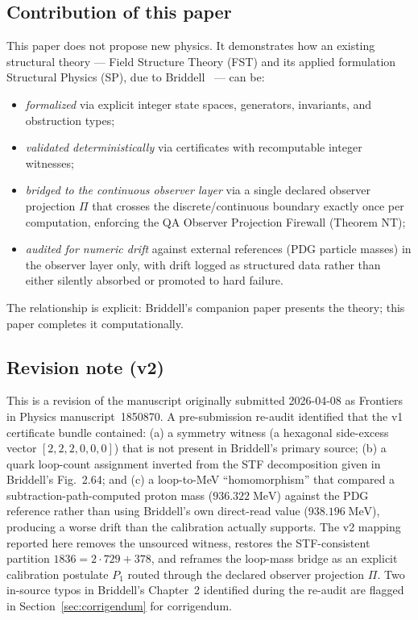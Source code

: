 \documentclass[12pt,a4paper]{article}
\begin{document}
\subsection{Contribution of this paper}

This paper does not propose new physics. It demonstrates how an existing
structural theory --- Field Structure Theory (FST) and its applied
formulation Structural Physics (SP), due to Briddell~\cite{briddellbook2020,
briddell2026} --- can be:
\begin{itemize}[nosep]
  \item \emph{formalized} via explicit integer state spaces, generators,
        invariants, and obstruction types;
  \item \emph{validated deterministically} via certificates with
        recomputable integer witnesses;
  \item \emph{bridged to the continuous observer layer} via a single
        declared observer projection $\Pi$ that crosses the discrete/continuous
        boundary exactly once per computation, enforcing the QA Observer
        Projection Firewall (Theorem NT);
  \item \emph{audited for numeric drift} against external references (PDG
        particle masses) in the observer layer only, with drift logged as
        structured data rather than either silently absorbed or promoted to
        hard failure.
\end{itemize}
The relationship is explicit: Briddell's companion paper presents the
theory; this paper completes it computationally.

\subsection{Revision note (v2)}

This is a revision of the manuscript originally submitted 2026-04-08
as Frontiers in Physics manuscript~1850870. A pre-submission re-audit
identified that the v1 certificate bundle contained: (a) a symmetry
witness (a hexagonal side-excess vector $[2,2,2,0,0,0]$) that is not
present in Briddell's primary source; (b) a quark loop-count
assignment inverted from the STF decomposition given in Briddell's
Fig.~2.64; and (c) a loop-to-MeV ``homomorphism'' that compared a
subtraction-path-computed proton mass ($936.322\;\mathrm{MeV}$)
against the PDG reference rather than using Briddell's own
direct-read value ($938.196\;\mathrm{MeV}$), producing a worse drift
than the calibration actually supports. The v2 mapping reported here
removes the unsourced witness, restores the STF-consistent partition
$1836 = 2 \cdot 729 + 378$, and reframes the loop-mass bridge as an
explicit calibration postulate $P_1$ routed through the declared
observer projection $\Pi$. Two in-source typos in Briddell's
Chapter~2 identified during the re-audit are flagged in
Section~\ref{sec:corrigendum} for corrigendum.
\end{document}
